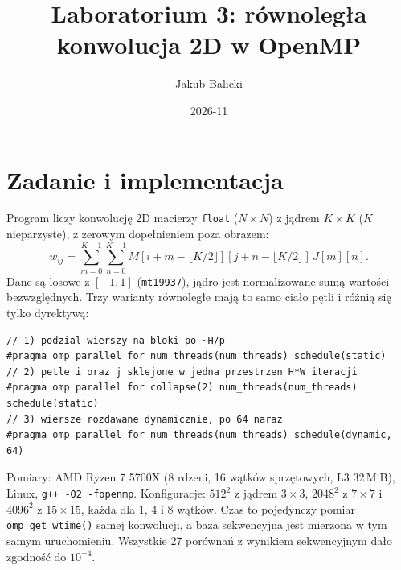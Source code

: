 \documentclass[11pt,a4paper]{article}
\title{Laboratorium 3: równoległa konwolucja 2D w OpenMP}
\author{Jakub Balicki}
\date{2026-11}
\begin{document}
\maketitle
\vspace{-1em}

\section{Zadanie i implementacja}
Program liczy konwolucję 2D macierzy \texttt{float} ($N\times N$) z jądrem $K\times K$ ($K$ nieparzyste), z zerowym dopełnieniem poza obrazem:
\begin{equation}
  w_{ij}=\sum_{m=0}^{K-1}\sum_{n=0}^{K-1} M\!\left[i+m-\lfloor K/2\rfloor\right]\!\left[j+n-\lfloor K/2\rfloor\right]\,J[m][n].
\end{equation}
Dane są losowe z $[-1,1]$ (\texttt{mt19937}), jądro jest normalizowane sumą wartości bezwzględnych. Trzy warianty równoległe mają to samo ciało pętli i różnią się tylko dyrektywą:
\begin{lstlisting}
// 1) podzial wierszy na bloki po ~H/p
#pragma omp parallel for num_threads(num_threads) schedule(static)
// 2) petle i oraz j sklejone w jedna przestrzen H*W iteracji
#pragma omp parallel for collapse(2) num_threads(num_threads) schedule(static)
// 3) wiersze rozdawane dynamicznie, po 64 naraz
#pragma omp parallel for num_threads(num_threads) schedule(dynamic, 64)
\end{lstlisting}

Pomiary: AMD Ryzen 7 5700X (8 rdzeni, 16 wątków sprzętowych, L3 32\,MiB), Linux, \texttt{g++ -O2 -fopenmp}. Konfiguracje: $512^2$ z jądrem $3\times3$, $2048^2$ z $7\times7$ i $4096^2$ z $15\times15$, każda dla 1, 4 i 8 wątków. Czas to pojedynczy pomiar \texttt{omp\_get\_wtime()} samej konwolucji, a baza sekwencyjna jest mierzona w tym samym uruchomieniu. Wszystkie 27 porównań z wynikiem sekwencyjnym dało zgodność do $10^{-4}$.
\end{document}
